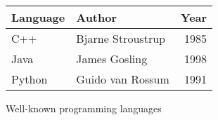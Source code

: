 \centering
\begin{tabular}{llr}
    \toprule
    Language & Author            & Year \\
    \midrule
    C++      & Bjarne Stroustrup & 1985 \\
    Java     & James Gosling     & 1998 \\
    Python   & Guido van Rossum  & 1991 \\
    \bottomrule
\end{tabular}
\caption*{Well-known programming languages}

